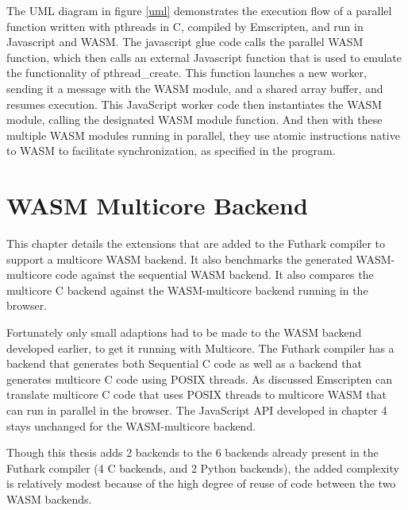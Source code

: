\documentclass[11pt]{book}
\begin{document}

The UML diagram in figure \ref{uml} demonstrates the execution flow of a parallel function written with pthreads in C, compiled by Emscripten, and run in Javascript and WASM. The javascript glue code calls the parallel WASM function, which then calls an external Javascript function that is used to emulate the functionality of pthread\_create. This function launches a new worker, sending it a message with the WASM module, and a shared array buffer, and resumes execution. This JavaScript worker code then  instantiates the WASM module, calling the designated WASM module function. And then with these multiple WASM modules running in parallel, they use atomic instructions native to WASM to facilitate synchronization, as specified in the program.




\newpage
\chapter{WASM Multicore Backend}

This chapter details the extensions that are added to the Futhark compiler to support a multicore WASM backend. It also benchmarks the generated WASM-multicore code against the sequential WASM backend. It also compares the multicore C backend against the WASM-multicore backend running in the browser.

Fortunately only small adaptions had to be made to the WASM backend developed earlier, to get it running with Multicore. The Futhark compiler has a backend that generates both Sequential C code as well as a backend that generates multicore C code using POSIX threads. As discussed Emscripten can translate multicore C code that uses POSIX threads to multicore WASM that can run in parallel in the browser. The JavaScript API developed in chapter 4 stays unchanged for the WASM-multicore backend. 

Though this thesis adds 2 backends to the 6 backends already present in the Futhark compiler (4 C backends, and 2 Python backends), the added complexity is relatively modest because of the high degree of reuse of code between the two WASM backends. 
\end{document}
